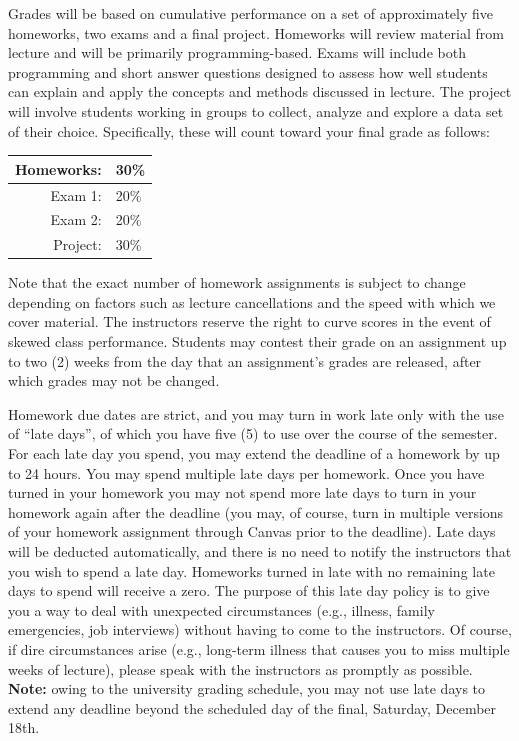 \documentclass[11pt,oneside]{amsart}
\begin{document}
Grades will be based on cumulative performance on a set of approximately five homeworks, two exams and a final project.
Homeworks will review material from lecture and will be primarily programming-based.
Exams will include both programming and short answer questions designed to assess how well students can explain and apply the concepts and methods discussed in lecture.
The project will involve students working in groups to collect, analyze and explore a data set of their choice.
Specifically, these will count toward your final grade as follows:
\begin{center}
\begin{tabular}{| r | l |}
\hline
Homeworks: &30\% \\
\hline
Exam 1: & 20\% \\
\hline
Exam 2: & 20\% \\
\hline
Project: & 30\% \\
\hline
\end{tabular}
\end{center}

Note that the exact number of homework assignments is subject to change depending on factors such as lecture cancellations and the speed with which we cover material.
The instructors reserve the right to curve scores in the event of skewed class performance.
Students may contest their grade on an assignment up to two (2) weeks from the day that an assignment's grades are released, after which grades may not
be changed.

Homework due dates are strict, and you may turn in work late only with the use of ``late days'', of which you have five (5) to use over the course of the semester.
For each late day you spend, you may extend the deadline of a homework by up to 24 hours.
You may spend multiple late days per homework.
Once you have turned in your homework you may not spend more late days to turn in your homework again after the deadline (you may, of course, turn in multiple versions of your homework assignment through Canvas prior to the deadline).
Late days will be deducted automatically, and there is no need to notify the instructors that you wish to spend a late day.
Homeworks turned in late with no remaining late days to spend will receive a zero.
The purpose of this late day policy is to give you a way to deal with unexpected circumstances (e.g., illness, family emergencies, job interviews) without having to come to the instructors.
Of course, if dire circumstances arise (e.g., long-term illness that causes you to miss multiple weeks of lecture), please speak with the instructors as promptly as possible.
{\bf Note:} owing to the university grading schedule,
you may not use late days to extend any deadline beyond the scheduled day of the final, Saturday, December 18th.
\end{document}
